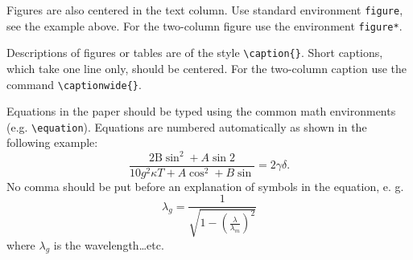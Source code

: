 \documentclass{poster16}
\begin{document}
Figures are also centered in the text column. Use standard environment \verb+figure+, see the example above. For the two-column figure use the environment \verb+figure*+. 

Descriptions of figures or tables are of the style \verb+\caption{}+. Short captions, which take one line only, should be centered. For the two-column caption use the command \verb+\captionwide{}+.

Equations in the paper should be typed using the common math  environments (e.g. \verb+\equation+). Equations are numbered automatically as shown in the following example:
\begin{equation}
\frac{2\mathrm{B} \sin^2 + A \sin2}{10 g^2 \kappa T + A \cos^2 + B \sin}= 2 \gamma\delta .
\end{equation}
No comma should be put before an explanation of symbols in the equation, e. g. 
\begin{equation}
       \lambda_g =\frac{1}{\sqrt{1-\left(\frac{\lambda}{\lambda_m}\right)^2}}
\end{equation}	
where $\lambda_g$ is the wavelength\dots etc.
\end{document}
